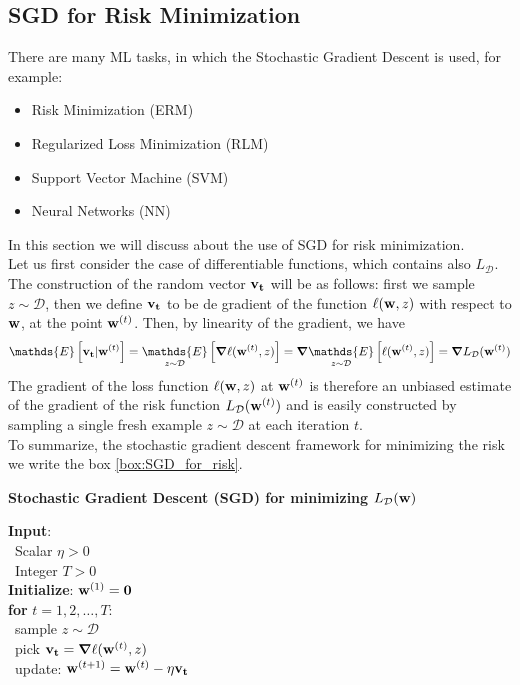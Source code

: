\documentclass[12pt]{report}
\theoremstyle{plain}
\newcommand\mcl[1]{\mathcal{#1}}
\begin{document}
\begin{flushleft}
\subsection{SGD for Risk Minimization}
There are many ML tasks, in which the Stochastic Gradient Descent is used, for example:
\begin{itemize}
	\item Risk Minimization (ERM)
	\item Regularized Loss Minimization (RLM)
	\item Support Vector Machine (SVM)
	\item Neural Networks (NN)
\end{itemize}
In this section we will discuss about the use of SGD for risk minimization.\\
Let us first consider the case of differentiable functions, which contains also $L_\mcl{D}$. The construction of the random vector $\vb{v_t}$ will be as follows: first we sample $z\sim\mcl{D}$, then we define $\vb{v_t}$ to be de gradient of the function $\ell(\vb{w},z)$ with respect to $\vb{w}$, at the point $\vb{w}^{(t)}$. Then, by linearity of the gradient, we have 
\[ \mathds{E}\left[\vb{v_t}|\vb{w}^{(t)} \right] = \underset{z\sim\mcl{D}}{\mathds{E}}\left[\grad{\ell}(\vb{w}^{(t)},z)\right]=\grad{\underset{z\sim\mcl{D}}{\mathds{E}}\left[\ell(\vb{w}^{(t)},z)\right]} = \grad{L_\mcl{D}}(\vb{w}^{(t)}) \]
The gradient of the loss function $\ell(\vb{w},z)$ at $\vb{w}^{(t)}$ is therefore an unbiased estimate of the gradient of the risk function $L_\mcl{D}(\vb{w}^{(t)})$ and is easily constructed by sampling a single fresh example $z\sim\mcl{D}$ at each iteration $t$.\\
To summarize, the stochastic gradient descent framework for minimizing the
risk we write the box \ref{box:SGD_for_risk}.\\

\begin{tcolorbox}
	\begin{center}
		\textbf{Stochastic Gradient Descent (SGD) for minimizing $L_\mcl{D}(\vb{w})$}
	\end{center}
	\textbf{Input}:\\
	\-\ Scalar $\eta>0$\\
	\-\ Integer $T>0$\\
	
	\textbf{Initialize}: \quad $\vb{w}^{(1)}=\vb{0}$\\
	
	\textbf{for} $t=1,2,\dots,T$:\\
	\-\ sample $z\sim\mcl{D}$\\
	\-\ pick $\vb{v_t}=\grad{\ell}(\vb{w}^{(t)},z)$\\
	\-\ update: $\vb{w}^{(t+1)} = \vb{w}^{(t)}-\eta\vb{v_t}$ \\
	

\end{tcolorbox}
\end{flushleft}
\end{document}
